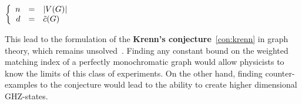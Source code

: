 \begin{center}
    $\left\{
        \begin{array}{r c l}
            n & = & \left|V(G)\right| \\
            d & = & \Tilde{c}(G)
        \end{array}
    \right.$
\end{center}

This lead to the formulation of the \textbf{Krenn's conjecture}~\ref{con:krenn} in graph theory, which remains unsolved~\cite{wordpress}.
Finding any constant bound on the weighted matching index of a perfectly monochromatic graph would allow physicists to know the limits of this class of experiments.
On the other hand, finding counter-examples to the conjecture would lead to the ability to create higher dimensional GHZ-states. \\


